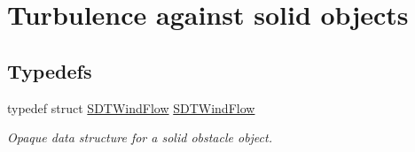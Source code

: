 \hypertarget{group__windflow}{}\section{Turbulence against solid objects}
\label{group__windflow}
\subsection*{Typedefs}
\begin{DoxyCompactItemize}
\item 
\hypertarget{group__windflow_ga7eba31614e4346c35a480ca5da3945fe}{}typedef struct \hyperlink{group__windflow_ga7eba31614e4346c35a480ca5da3945fe}{S\+D\+T\+Wind\+Flow} \hyperlink{group__windflow_ga7eba31614e4346c35a480ca5da3945fe}{S\+D\+T\+Wind\+Flow}\label{group__windflow_ga7eba31614e4346c35a480ca5da3945fe}

\begin{DoxyCompactList}\small\item\em Opaque data structure for a solid obstacle object. \end{DoxyCompactList}\end{DoxyCompactItemize}
